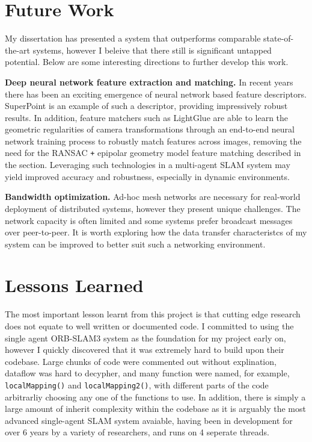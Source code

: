 

\label{sec:5}

\section{Future Work}
\label{sec:future-work}
My dissertation has presented a system that outperforms comparable state-of-the-art systems, however I beleive that there still is significant untapped potential. Below are some interesting directions to further develop this work.

\textbf{Deep neural network feature extraction and matching.} In recent years there has been an exciting emergence of neural network based feature descriptors. SuperPoint \autocite{detone18superpoint} is an example of such a descriptor, providing impressively robust results. In addition, feature matchers such as LightGlue \autocite{lindenberger2023lightglue} are able to learn the geometric regularities of camera transformations through an end-to-end neural network training process to robustly match features across images, removing the need for the RANSAC \texttt{+} epipolar geometry model feature matching described in the  section. Leveraging such technologies in a multi-agent SLAM system may yield improved accuracy and robustness, especially in dynamic environments.

\textbf{Bandwidth optimization.} Ad-hoc mesh networks are necessary for real-world deployment of distributed systems, however they present unique challenges. The network capacity is often limited and some systems prefer broadcast messages over peer-to-peer. It is worth exploring how the data transfer characteristcs of my system can be improved to better suit such a networking environment.

\section{Lessons Learned}
\label{sec:lessons-learned}
The most important lesson learnt from this project is that cutting edge research does not equate to well written or documented code. I committed to using the single agent ORB-SLAM3 system as the foundation for my project early on, however I quickly discovered that it was extremely hard to build upon their codebase. Large chunks of code were commented out without explination, dataflow was hard to decypher, and many function were named, for example, \texttt{localMapping()} and \texttt{localMapping2()}, with different parts of the code arbitrarliy choosing any one of the functions to use. In addition, there is simply a large amount of inherit complexity within the codebase as it is arguably the most advanced single-agent SLAM system avaiable, having been in development for over 6 years by a variety of researchers, and runs on 4 seperate threads.

